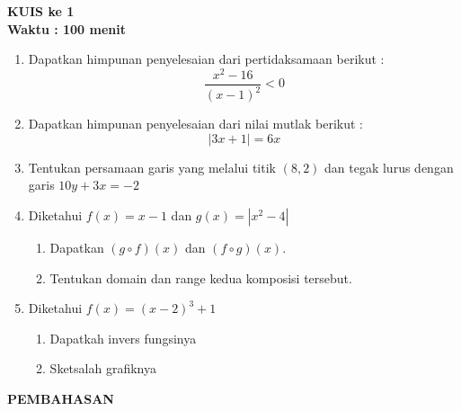 \documentclass[12pt,a4paper]{article}
\begin{document}
\begin{center}
  \textbf{\Large KUIS ke 1}\\[0.5cm]
  \textbf{\large Waktu : 100 menit}
\end{center}
\vspace{0.5cm}

\begin{enumerate}
  \item Dapatkan himpunan penyelesaian dari pertidaksamaan berikut :
        \[ \frac{x^2 - 16}{(x - 1)^2} < 0 \]

  \item Dapatkan himpunan penyelesaian dari nilai mutlak berikut :
        \[ |3x + 1| = 6x \]

  \item Tentukan persamaan garis yang melalui titik $(8,2)$ dan tegak lurus dengan garis $10y + 3x = -2$

  \item Diketahui $f(x) = x - 1$ dan $g(x) = |x^2 - 4|$
        \begin{enumerate}[label=\alph*.]
          \item Dapatkan $(g \circ f)(x)$ dan $(f \circ g)(x)$.
          \item Tentukan domain dan range kedua komposisi tersebut.
        \end{enumerate}

  \item Diketahui $f(x) = (x - 2)^3 + 1$
        \begin{enumerate}[label=\alph*.]
          \item Dapatkah invers fungsinya
          \item Sketsalah grafiknya
        \end{enumerate}
\end{enumerate}

\newpage
\begin{center}
  \textbf{\Large PEMBAHASAN}
\end{center}
\end{document}
